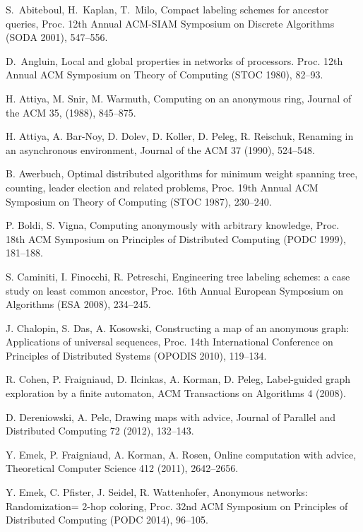 \documentclass{article}
\begin{document}

\begin{thebibliography}{99}


S.~Abiteboul, H.~Kaplan, T.~Milo, Compact labeling schemes for ancestor
queries, Proc. 12th Annual ACM-SIAM Symposium on Discrete
Algorithms (SODA 2001), 547--556.

D.~Angluin, Local and global properties in networks of processors. 
Proc. 12th Annual ACM Symposium on Theory of Computing (STOC 1980), 82--93.

H. Attiya, M. Snir, M. Warmuth,
Computing on an anonymous ring,
Journal of the ACM 35, (1988), 845--875.

H. Attiya, A. Bar-Noy, D. Dolev, D. Koller, D. Peleg, R. Reischuk,
Renaming in an asynchronous environment,  Journal of the ACM 37 (1990), 524--548.

B. Awerbuch, Optimal distributed algorithms for minimum weight spanning tree, 
counting, leader election and related problems,
Proc. 19th Annual ACM Symposium on Theory of Computing (STOC 1987), 230--240.


P. Boldi, S. Vigna,
Computing anonymously with arbitrary knowledge,
Proc. 18th ACM Symposium on Principles of Distributed Computing (PODC 1999), 181--188.

S. Caminiti, I. Finocchi, R. Petreschi,
Engineering tree labeling schemes: a case study on least common ancestor,
Proc. 16th Annual European Symposium on Algorithms (ESA 2008), 234--245.


J. Chalopin, S. Das, A. Kosowski, 
Constructing a map of an anonymous graph: Applications of universal sequences,
Proc. 14th International Conference on Principles of Distributed Systems (OPODIS 2010), 119--134.


R. Cohen, P. Fraigniaud, D. Ilcinkas, A. Korman, D. Peleg, 
Label-guided graph exploration by a finite automaton, 
ACM Transactions on Algorithms 4 (2008).


D. Dereniowski, A. Pelc, Drawing maps with advice,  Journal of Parallel and Distributed Computing 72 (2012), 132--143. 



Y. Emek, P. Fraigniaud, A. Korman, A. Rosen, Online computation with advice, Theoretical Computer Science 412 (2011), 2642--2656.

Y. Emek, C. Pfister, J. Seidel, R. Wattenhofer, Anonymous networks: Randomization= 2-hop coloring,
Proc. 32nd ACM Symposium on Principles of Distributed Computing (PODC 2014), 96--105.


\end{thebibliography}
\end{document}
